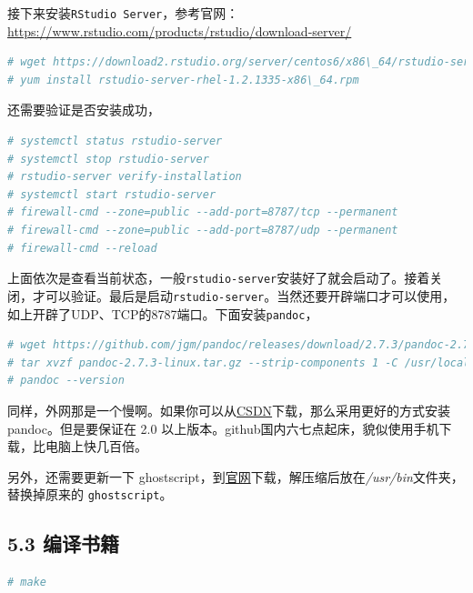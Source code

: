 \documentclass[doctor,openright,twoside]{sjtuthesis}
\newcommand{\passthrough}[1]{#1}
\theoremstyle{plain}
\theoremstyle{definition}
\theoremstyle{remark}
\theoremstyle{ocrenumbox}
\theoremstyle{plain}
\begin{document}
接下来安装\passthrough{\lstinline!RStudio Server!}，参考官网：\url{https://www.rstudio.com/products/rstudio/download-server/}

\begin{lstlisting}[language=bash]
# wget https://download2.rstudio.org/server/centos6/x86\_64/rstudio-server-rhel-1.2.1335-x86\_64.rpm
# yum install rstudio-server-rhel-1.2.1335-x86\_64.rpm
\end{lstlisting}

还需要验证是否安装成功，

\begin{lstlisting}[language=bash]
# systemctl status rstudio-server
# systemctl stop rstudio-server
# rstudio-server verify-installation
# systemctl start rstudio-server
# firewall-cmd --zone=public --add-port=8787/tcp --permanent
# firewall-cmd --zone=public --add-port=8787/udp --permanent
# firewall-cmd --reload
\end{lstlisting}

上面依次是查看当前状态，一般\passthrough{\lstinline!rstudio-server!}安装好了就会启动了。接着关闭，才可以验证。最后是启动\passthrough{\lstinline!rstudio-server!}。当然还要开辟端口才可以使用，如上开辟了UDP、TCP的8787端口。下面安装\passthrough{\lstinline!pandoc!}，

\begin{lstlisting}[language=bash]
# wget https://github.com/jgm/pandoc/releases/download/2.7.3/pandoc-2.7.3-linux.tar.gz
# tar xvzf pandoc-2.7.3-linux.tar.gz --strip-components 1 -C /usr/local/
# pandoc --version
\end{lstlisting}

同样，外网那是一个慢啊。如果你可以从\href{https://download.csdn.net/download/bubifengyun/11258661}{CSDN}下载，那么采用更好的方式安装 pandoc。但是要保证在 2.0 以上版本。github国内六七点起床，貌似使用手机下载，比电脑上快几百倍。

另外，还需要更新一下 ghostscript，到\href{https://www.ghostscript.com/download/gsdnld.html}{官网}下载，解压缩后放在\emph{/usr/bin}文件夹，替换掉原来的 \passthrough{\lstinline!ghostscript!}。

\hypertarget{section-139}{%
\subsection{5.3 编译书籍}\label{section-139}}

\begin{lstlisting}[language=bash]
# make
\end{lstlisting}
\end{document}
